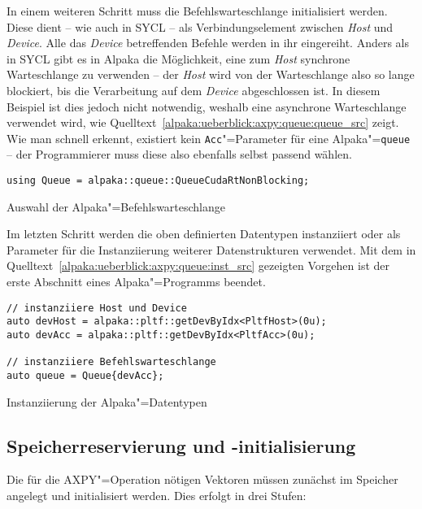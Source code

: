 In einem weiteren Schritt muss die Befehlswarteschlange initialisiert werden.
Diese dient -- wie auch in SYCL -- als Verbindungselement zwischen \textit{Host}
und \textit{Device}. Alle das \textit{Device} betreffenden Befehle werden in
ihr eingereiht. Anders als in SYCL gibt es in Alpaka die Möglichkeit, eine zum
\textit{Host} synchrone Warteschlange zu verwenden -- der \textit{Host} wird von
der Warteschlange also so lange blockiert, bis die Verarbeitung auf dem
\textit{Device} abgeschlossen ist. In diesem Beispiel ist dies jedoch nicht
notwendig, weshalb eine asynchrone Warteschlange verwendet wird, wie
Quelltext~\ref{alpaka:ueberblick:axpy:queue:queue_src} zeigt. Wie man schnell
erkennt, existiert kein \texttt{Acc}"=Parameter für eine Alpaka"=\texttt{queue}
-- der Programmierer muss diese also ebenfalls selbst passend wählen.

\begin{code}
    \begin{verbatim}
using Queue = alpaka::queue::QueueCudaRtNonBlocking;
    \end{verbatim}
    \caption{Auswahl der Alpaka"=Befehlswarteschlange}
    \label{alpaka:ueberblick:axpy:queue:queue_src}
\end{code}

Im letzten Schritt werden die oben definierten Datentypen instanziiert oder als
Parameter für die Instanziierung weiterer Datenstrukturen verwendet. Mit dem
in Quelltext~\ref{alpaka:ueberblick:axpy:queue:inst_src} gezeigten Vorgehen ist
der erste Abschnitt eines Alpaka"=Programms beendet.

\begin{code}
    \begin{verbatim}
// instanziiere Host und Device
auto devHost = alpaka::pltf::getDevByIdx<PltfHost>(0u);
auto devAcc = alpaka::pltf::getDevByIdx<PltfAcc>(0u);

// instanziiere Befehlswarteschlange
auto queue = Queue{devAcc};
    \end{verbatim}
    \caption{Instanziierung der Alpaka"=Datentypen}
    \label{alpaka:ueberblick:axpy:queue:inst_src}
\end{code}

\subsection{Speicherreservierung und -initialisierung}
\label{alpaka:ueberblick:axpy:buffer}

Die für die AXPY"=Operation nötigen Vektoren müssen zunächst im Speicher
angelegt und initialisiert werden. Dies erfolgt in drei Stufen:

